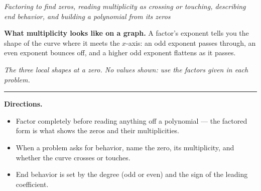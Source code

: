 \documentclass[12pt]{article}
\begin{document}

\begin{center}\small\textit{Factoring to find zeros, reading multiplicity as
crossing or touching, describing end behavior, and building a polynomial from
its zeros}\end{center}

\noindent\textbf{What multiplicity looks like on a graph.} A factor's exponent
tells you the shape of the curve where it meets the $x$-axis: an odd exponent
passes through, an even exponent bounces off, and a higher odd exponent
flattens as it passes.

\begin{center}
\end{center}
\noindent\small\textit{The three local shapes at a zero. No values shown: use the
factors given in each problem.}\normalsize

\smallskip
\noindent\rule{\linewidth}{0.4pt}
\smallskip

\noindent\textbf{Directions.}
\begin{itemize}[itemsep=2pt]
  \item Factor completely before reading anything off a polynomial --- the
        factored form is what shows the zeros and their multiplicities.
  \item When a problem asks for behavior, name the zero, its multiplicity, and
        whether the curve crosses or touches.
  \item End behavior is set by the degree (odd or even) and the sign of the
        leading coefficient.
\end{itemize}
\end{document}
